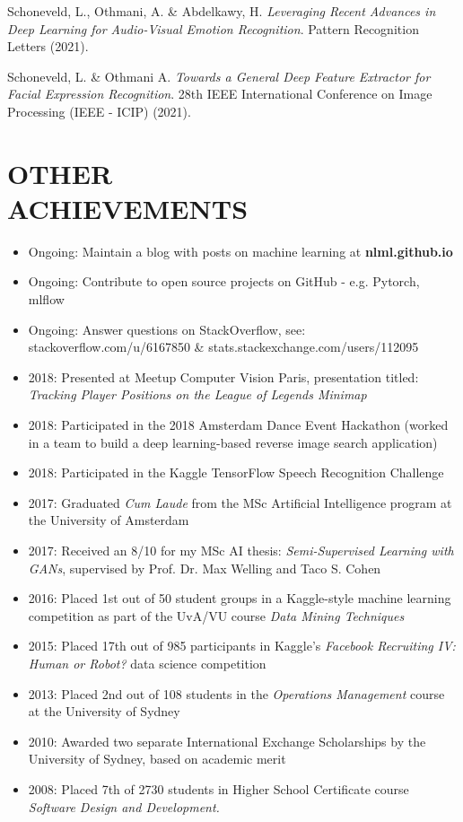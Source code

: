 \documentclass[margin]{res}
\begin{document}
\begin{resume}
		Schoneveld, L., Othmani, A. \& Abdelkawy, H. \textit{Leveraging Recent Advances in Deep Learning for Audio-Visual Emotion Recognition}. Pattern Recognition Letters (2021).
		
		Schoneveld, L. \& Othmani A. 
		\textit{Towards a General Deep Feature Extractor for Facial Expression Recognition}. 28th IEEE International Conference on Image Processing (IEEE - ICIP) (2021).
		
		\section{OTHER \\ ACHIEVEMENTS}
		
		\begin{itemize}
			\item Ongoing: Maintain a blog with posts on machine learning at \textbf{nlml.github.io}
			\item Ongoing: Contribute to open source projects on GitHub - e.g. Pytorch, mlflow
			\item Ongoing: Answer questions on StackOverflow, see:\\stackoverflow.com/u/6167850 \& stats.stackexchange.com/users/112095
			\item 2018: Presented at Meetup Computer Vision Paris, presentation titled:\\ \emph{Tracking Player Positions on the League of Legends Minimap}
			\item 2018: Participated in the 2018 Amsterdam Dance Event Hackathon (worked in a team to build a deep learning-based reverse image search application)
			\item 2018: Participated in the Kaggle TensorFlow Speech Recognition Challenge
			\item 2017: Graduated {\it Cum Laude} from the MSc Artificial Intelligence program at the University of Amsterdam
			\item 2017: Received an 8/10 for my MSc AI thesis: {\it Semi-Supervised Learning with GANs}, supervised by Prof. Dr. Max Welling and Taco S. Cohen
			\item 2016: Placed 1st out of 50 student groups in a Kaggle-style machine learning competition as part of the UvA/VU course \textit{Data Mining Techniques}
			\item 2015: Placed 17th out of 985 participants in Kaggle's {\sl Facebook Recruiting IV: Human or Robot?} data science competition
			\item 2013: Placed 2nd out of 108 students in the \textit{Operations Management} course at the University of Sydney
			\item 2010: Awarded two separate International Exchange Scholarships by the University of Sydney, based on academic merit
			\item 2008: Placed 7th of 2730 students in Higher School Certificate course {\sl Software Design and Development.}
		\end{itemize}
		

\end{resume}
\end{document}
